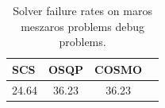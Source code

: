 \begin{table}
\centering
\caption{Solver failure rates on maros meszaros problems debug problems.}
\label{t-maros meszaros problems debug-failure}
\begin{tabular}{lccc}
\toprule
  SCS &  OSQP &  COSMO \\
\midrule
24.64 & 36.23 &  36.23 \\
\bottomrule
\end{tabular}
\end{table}
